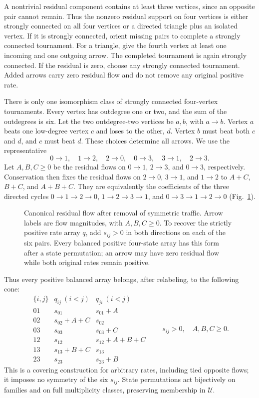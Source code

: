 \documentclass[11pt,a4paper]{article}
\newcommand{\U}{\mathcal U}
\begin{document}
A nontrivial residual component contains at least three vertices, since
an opposite pair cannot remain. Thus the nonzero residual support on four
vertices is either strongly connected on all four vertices or a directed
triangle plus an isolated vertex. If it is strongly connected, orient
missing pairs to complete a strongly connected tournament. For a triangle,
give the fourth vertex at least one incoming and one outgoing arrow.
The completed tournament is again strongly connected. If the residual
is zero, choose any strongly connected tournament. Added arrows carry
zero residual flow and do not remove any original positive rate.

There is only one isomorphism class of strongly connected four-vertex
tournaments. Every vertex has outdegree one or two, and the sum of the
outdegrees is six. Let the two outdegree-two vertices be $a,b$, with
$a\to b$. Vertex $a$ beats one low-degree vertex $c$ and loses to the
other, $d$. Vertex $b$ must beat both $c$ and $d$, and $c$ must beat $d$.
These choices determine all arrows. We use the representative
\begin{equation}
 0\to1,\quad1\to2,\quad2\to0,\quad
 0\to3,\quad3\to1,\quad2\to3.
 \label{eq:tournament}
\end{equation}
Let $A,B,C\ge0$ be the residual flows on $0\to1$, $2\to3$,
and $0\to3$, respectively. Conservation then fixes the residual flows
on $2\to0$, $3\to1$, and $1\to2$ to $A+C$, $B+C$, and $A+B+C$.
They are equivalently the coefficients of the three directed cycles
$0\to1\to2\to0$, $1\to2\to3\to1$, and
$0\to3\to1\to2\to0$ (Fig.~\ref{fig:cone}).

\begin{figure}[tb]
 \centering
 
 \caption{Canonical residual flow after removal of symmetric traffic.
 Arrow labels are flow magnitudes, with $A,B,C\ge0$.
 To recover the strictly positive rate array $q$, add $s_{ij}>0$ in
 both directions on each of the six pairs. Every balanced positive
 four-state array has this form after a state permutation; an arrow
 may have zero residual flow while both original rates remain positive.}
 \label{fig:cone}
\end{figure}

Thus every positive balanced array belongs, after relabeling, to the
following cone:
\begin{equation}
\begin{array}{c|ll}
 \{i,j\} & q_{ij}\ (i<j) & q_{ji}\ (i<j)\\\hline
 01 & s_{01} & s_{01}+A\\
 02 & s_{02}+A+C & s_{02}\\
 03 & s_{03} & s_{03}+C\\
 12 & s_{12} & s_{12}+A+B+C\\
 13 & s_{13}+B+C & s_{13}\\
 23 & s_{23} & s_{23}+B
\end{array}
\qquad s_{ij}>0,\quad A,B,C\ge0.
\label{eq:rates}
\end{equation}
This is a covering construction for arbitrary rates, including tied
opposite flows; it imposes no symmetry of the six $s_{ij}$. State
permutations act bijectively on families and on full multiplicity
classes, preserving membership in $\U$.
\end{document}
